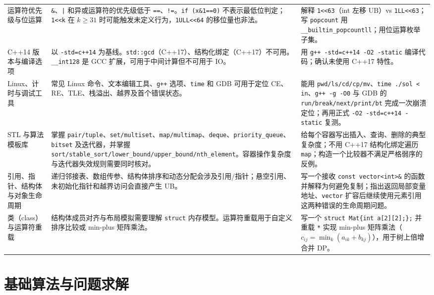 \documentclass[a4paper,11pt]{article}
\newcommand{\code}[1]{\texttt{#1}}
\begin{document}
\begin{longtable}{L{2.4cm} L{7.5cm} L{6.8cm}}
运算符优先级与位运算
& \code{\&}、\code{|} 和异或运算符的优先级低于 \code{==}、\code{!=}。\code{if (x\&1==0)} 不表示最低位判定；\code{1<<k} 在 $k\ge31$ 时可能触发未定义行为，\code{1ULL<<64} 的移位量也非法。
& 解释 \code{1<<63}（int 左移 UB）vs \code{1LL<<63}；写 \code{popcount} 用 \code{\_\_builtin\_popcountll}；用位运算枚举子集。\\[2mm]

C++14 版本与编译选项
& 以 \code{-std=c++14} 为基线。\code{std::gcd}（C++17）、结构化绑定（C++17）不可用。\code{\_\_int128} 是 GCC 扩展，可用于中间计算但不可用于 IO。
& 用 \code{g++ -std=c++14 -O2 -static} 编译代码；确认未使用 C++17 特性。\\[2mm]

Linux、计时与调试工具
& 常见 Linux 命令、文本编辑工具、\code{g++} 选项、\code{time} 和 GDB 可用于定位 CE、RE、TLE、栈溢出、越界及首个错误状态。
& 能用 \code{pwd/ls/cd/cp/mv}、\code{time ./sol < in}、\code{g++ -g -O0} 与 GDB 的 \code{run/break/next/print/bt} 完成一次崩溃定位；再用正式 \code{-O2 -std=c++14 -static} 复测。\\[2mm]

STL 与算法模板库
& 掌握 \code{pair/tuple}、\code{set/multiset}、\code{map/multimap}、\code{deque}、\code{priority\_queue}、\code{bitset} 及迭代器，并掌握 \code{sort/stable\_sort/lower\_bound/upper\_bound/nth\_element}。容器操作复杂度与迭代器失效规则需要同时核对。
& 给每个容器写出插入、查询、删除的典型复杂度；不用 C++17 结构化绑定遍历 \code{map}；构造一个比较器不满足严格弱序的反例。\\[2mm]

引用、指针、结构体与对象生命周期
& 递归邻接表、数组传参、结构体排序和动态分配会涉及引用/指针；悬空引用、未初始化指针和越界访问会直接产生 UB。
& 写一个接收 \code{const vector<int>\&} 的函数并解释为何避免复制；指出返回局部变量地址、\code{vector} 扩容后继续使用元素引用这两种错误的生命周期问题。\\[2mm]

类（class）与运算符重载
& 结构体成员对齐与布局模拟需要理解 \code{struct} 内存模型。运算符重载用于自定义排序比较或 min-plus 矩阵乘法。
& 写一个 \code{struct Mat\{int a[2][2];\};} 并重载 \code{*} 实现 min-plus 矩阵乘法（$c_{ij}=\min_k(a_{ik}+b_{kj})$），用于树上倍增合并 DP。\\
\end{longtable}

\newpage
\section{基础算法与问题求解}
\end{document}
